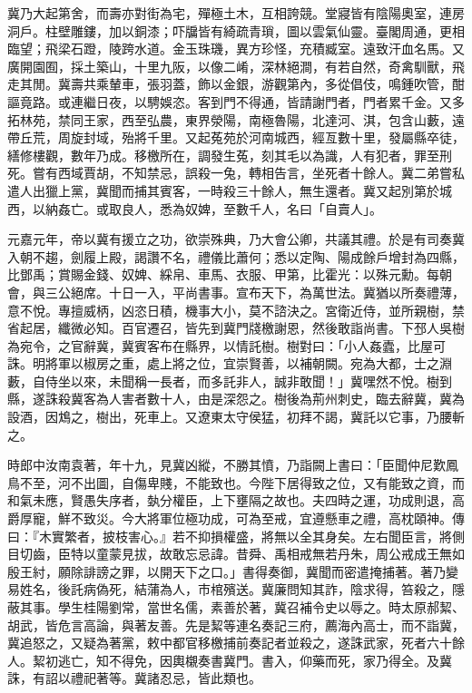 \begin{pinyinscope}
冀乃大起第舍，而壽亦對街為宅，殫極土木，互相誇競。堂寢皆有陰陽奧室，連房洞戶。柱壁雕鏤，加以銅漆；吓牖皆有綺疏青瑣，圖以雲氣仙靈。臺閣周通，更相臨望；飛梁石蹬，陵跨水道。金玉珠璣，異方珍怪，充積臧室。遠致汗血名馬。又廣開園囿，採土築山，十里九阪，以像二崤，深林絕澗，有若自然，奇禽馴獸，飛走其閒。冀壽共乘輦車，張羽蓋，飾以金銀，游觀第內，多從倡伎，鳴鍾吹管，酣謳竟路。或連繼日夜，以騁娛恣。客到門不得通，皆請謝門者，門者累千金。又多拓林苑，禁同王家，西至弘農，東界滎陽，南極魯陽，北達河、淇，包含山藪，遠帶丘荒，周旋封域，殆將千里。又起菟苑於河南城西，經亙數十里，發屬縣卒徒，繕修樓觀，數年乃成。移檄所在，調發生菟，刻其毛以為識，人有犯者，罪至刑死。嘗有西域賈胡，不知禁忌，誤殺一兔，轉相告言，坐死者十餘人。冀二弟嘗私遣人出獵上黨，冀聞而捕其賓客，一時殺三十餘人，無生還者。冀又起別第於城西，以納姦亡。或取良人，悉為奴婢，至數千人，名曰「自賣人」。

元嘉元年，帝以冀有援立之功，欲崇殊典，乃大會公卿，共議其禮。於是有司奏冀入朝不趨，劍履上殿，謁讚不名，禮儀比蕭何；悉以定陶、陽成餘戶增封為四縣，比鄧禹；賞賜金錢、奴婢、綵帛、車馬、衣服、甲第，比霍光：以殊元勳。每朝會，與三公絕席。十日一入，平尚書事。宣布天下，為萬世法。冀猶以所奏禮薄，意不悅。專擅威柄，凶恣日積，機事大小，莫不諮決之。宮衛近侍，並所親樹，禁省起居，纖微必知。百官遷召，皆先到冀門牋檄謝恩，然後敢詣尚書。下邳人吳樹為宛令，之官辭冀，冀賓客布在縣界，以情託樹。樹對曰：「小人姦蠹，比屋可誅。明將軍以椒房之重，處上將之位，宜崇賢善，以補朝闕。宛為大都，士之淵藪，自侍坐以來，未聞稱一長者，而多託非人，誠非敢聞！」冀嘿然不悅。樹到縣，遂誅殺冀客為人害者數十人，由是深怨之。樹後為荊州刺史，臨去辭冀，冀為設酒，因鴆之，樹出，死車上。又遼東太守侯猛，初拜不謁，冀託以它事，乃腰斬之。

時郎中汝南袁著，年十九，見冀凶縱，不勝其憤，乃詣闕上書曰：「臣聞仲尼歎鳳鳥不至，河不出圖，自傷卑賤，不能致也。今陛下居得致之位，又有能致之資，而和氣未應，賢愚失序者，埶分權臣，上下壅隔之故也。夫四時之運，功成則退，高爵厚寵，鮮不致災。今大將軍位極功成，可為至戒，宜遵懸車之禮，高枕頤神。傳曰：『木實繁者，披枝害心。』若不抑損權盛，將無以全其身矣。左右聞臣言，將側目切齒，臣特以童蒙見拔，故敢忘忌諱。昔舜、禹相戒無若丹朱，周公戒成王無如殷王紂，願除誹謗之罪，以開天下之口。」書得奏御，冀聞而密遣掩捕著。著乃變易姓名，後託病偽死，結蒲為人，市棺殯送。冀廉問知其詐，陰求得，笞殺之，隱蔽其事。學生桂陽劉常，當世名儒，素善於著，冀召補令史以辱之。時太原郝絜、胡武，皆危言高論，與著友善。先是絜等連名奏記三府，薦海內高士，而不詣冀，冀追怒之，又疑為著黨，敕中都官移檄捕前奏記者並殺之，遂誅武家，死者六十餘人。絜初逃亡，知不得免，因輿櫬奏書冀門。書入，仰藥而死，家乃得全。及冀誅，有詔以禮祀著等。冀諸忍忌，皆此類也。


\end{pinyinscope}

